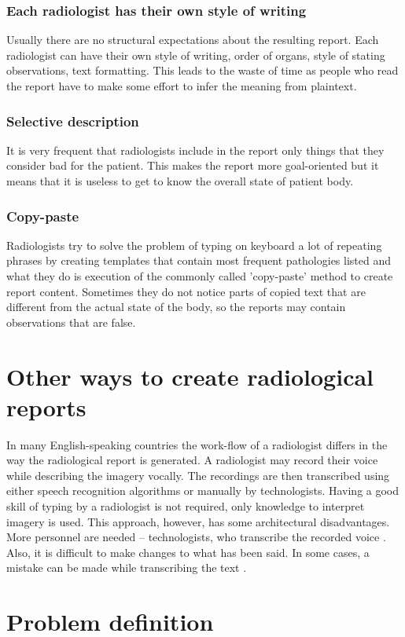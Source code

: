 \documentclass[12pt, twoside, openany]{report}
\theoremstyle{definition}
\begin{document}
\subsubsection{Each radiologist has their own style of writing}
Usually there are no structural expectations about the resulting report. Each radiologist can have their own style of writing, order of organs, style of stating observations, text formatting. This leads to the waste of time as people who read the report have to make some effort to infer the meaning from plaintext. 
\subsubsection{Selective description}
It is very frequent that radiologists include in the report only things that they consider bad for the patient. This makes the report more goal-oriented but it means that it is useless to get to know the overall state of patient body.
\subsubsection{Copy-paste}
Radiologists try to solve the problem of typing on keyboard a lot of repeating phrases by creating templates that contain most frequent pathologies listed and what they do is execution of the commonly called 'copy-paste' method to create report content. Sometimes they do not notice parts of copied text that are different from the actual state of the body, so the reports may contain observations that are false. 

\section{Other ways to create radiological reports}
In many English-speaking countries the work-flow of a radiologist differs in the way the radiological report is generated. A radiologist may record their voice while describing the imagery vocally. The recordings are then transcribed using either speech recognition algorithms or manually by technologists. Having a good skill of typing by a radiologist is not required, only knowledge to interpret imagery is used. This approach, however, has some architectural disadvantages. More personnel are needed -- technologists, who transcribe the recorded voice \cite{speech-impact}. Also, it is difficult to make changes to what has been said. In some cases, a mistake can be made while transcribing the text \cite{speech-africa}.

\section{Problem definition}
\end{document}
